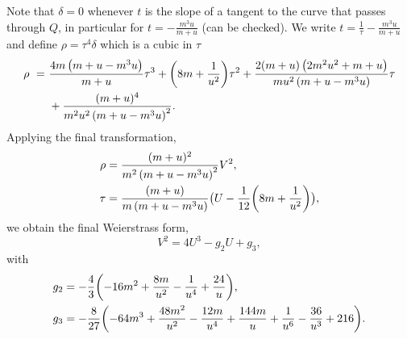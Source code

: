 \documentclass[11pt, a4paper]{article}
\numberwithin{equation}{section}
\begin{document}
Note that $\delta = 0$ whenever $t$ is the slope of a tangent to the curve that passes through $Q$, in particular for $t = -\frac{m^3 u}{m+u}$ (can be checked). We write $t = \frac{1}{\tau} -\frac{m^3 u}{m+u}$ and define $\rho = \tau^4 \delta$ which is a cubic in $\tau$
\begin{equation}
  \begin{split}
    \rho \ = \ &\frac{4 m \left(m+u-m^3 u\right)}{m+u} \tau^3 + \qty(8 m+\frac{1}{u^2}) \tau^2 + \frac{2 (m+u) \left(2 m^2 u^2+m+u\right)}{m u^2 \left(m+u-m^3 u\right)} \tau \\
    & + \frac{(m+u)^4}{m^2 u^2 \left(m+u-m^3 u\right)^2}.
  \end{split}
\end{equation}
Applying the final transformation,
\begin{align}
  \rho &= \frac{(m+u)^2}{m^2 \left(m+u-m^3 u\right)^2} V^2, \\
  \tau &= \frac{(m+u)}{m \left(m+u-m^3 u\right)} \bigl( U - \frac{1}{12} \qty(8 m+\frac{1}{u^2}) \bigr),
\end{align}
we obtain the final Weierstrass form,
\begin{equation}
  V^2 = 4 U^3 - g_2 U + g_3,
\end{equation}
with
\begin{align}\label{eqn:F1g23Nagell}
  g_2 &= -\frac{4}{3} \qty(-16 m^2+\frac{8 m}{u^2}-\frac{1}{u^4}+\frac{24}{u}), \\
  g_3 &= -\frac{8}{27} \qty(-64 m^3+\frac{48 m^2}{u^2}-\frac{12 m}{u^4}+\frac{144 m}{u}+\frac{1}{u^6}-\frac{36}{u^3}+216).
\end{align}
\end{document}
